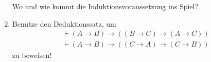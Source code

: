 \begin{aufgabe}
\begin{enumerate}
    Wo und wie kommt die Induktionsvoraussetzung ins Spiel?
\item Benutze den Deduktionssatz, um
\begin{displaymath}
      \begin{array}{c}
        \vdash (A\rightarrow
    B)\rightarrow ((B\rightarrow C)\rightarrow(A\rightarrow C))\\
        \vdash (A\rightarrow B)\rightarrow((C\rightarrow
        A)\rightarrow(C\rightarrow B))
      \end{array}
    \end{displaymath}
    zu
    beweisen!
  \end{enumerate}
\end{aufgabe}

